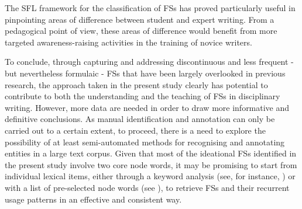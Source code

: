 \documentclass[output=paper]{langscibook}
\begin{document}
The SFL framework for the classification of FSs has proved particularly useful in pinpointing areas of difference between student and expert writing. From a pedagogical point of view, these areas of difference would benefit from more targeted awareness-raising activities in the training of novice writers. 

To conclude, through capturing and addressing discontinuous and less frequent - but nevertheless formulaic - FSs that have been largely overlooked in previous research, the approach taken in the present study clearly has potential to contribute to both the understanding and the teaching of FSs in disciplinary writing. However, more data are needed in order to draw more informative and definitive conclusions. As manual identification and annotation can only be carried out to a certain extent, to proceed, there is a need to explore the possibility of at least semi-automated methods for recognising and annotating entities in a large text corpus. Given that most of the ideational FSs identified in the present study involve two core node words, it may be promising to start from individual lexical items, either through a keyword analysis (see, for instance, \citealt{WangSoler2019}) or with a list of pre-selected node words (see \citealt{Römer2019}), to retrieve FSs and their recurrent usage patterns in an effective and consistent way.

{\sloppy\printbibliography[heading=subbibliography,notkeyword=this]}
\end{document}
